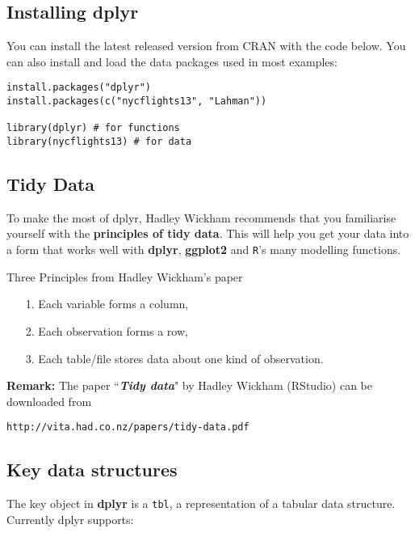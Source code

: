 \documentclass{article}
\begin{document}
\subsection{Installing dplyr}
You can install the latest released version from CRAN with the code below.
You can also install and load the data packages used in most examples: 
\begin{framed}
\begin{verbatim}
install.packages("dplyr")
install.packages(c("nycflights13", "Lahman"))

library(dplyr) # for functions
library(nycflights13) # for data
\end{verbatim}
\end{framed}

\subsection{Tidy Data}
To make the most of dplyr, Hadley Wickham recommends that you familiarise yourself with the \textbf{principles of tidy data}. This will help you get your data into a form that works well with \textbf{dplyr}, \textbf{ggplot2} and \texttt{R}'s many modelling functions.\\
\bigskip

\begin{framed}
\noindent Three Principles from Hadley Wickham's paper
	\begin{itemize}
		\item[1.] Each variable forms a column, 
		\item[2.] Each observation forms a row, 
		\item[3.] Each table/file stores data about one kind of observation.
	\end{itemize}
\end{framed}
\noindent \textbf{Remark:}  The paper ``\textit{\textbf{Tidy data}}" by Hadley Wickham (RStudio) can be downloaded from 
 \begin{verbatim}
http://vita.had.co.nz/papers/tidy-data.pdf
 \end{verbatim}


\subsection{Key data structures}

The key object in \textbf{dplyr} is a \texttt{tbl}, a representation of a tabular data structure. Currently dplyr supports:
\end{document}
